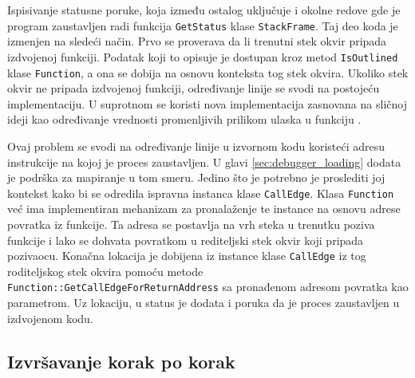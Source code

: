 \documentclass[12pt,oneside]{memoir}
\begin{document}
Ispisivanje statusne poruke, koja između ostalog uključuje i okolne redove gde je program zaustavljen radi funkcija \verb|GetStatus| klase \verb|StackFrame|.
Taj deo koda je izmenjen na sledeći način.
Prvo se proverava da li trenutni stek okvir pripada izdvojenoj funkciji.
Podatak koji to opisuje je dostupan kroz metod \verb|IsOutlined| klase \verb|Function|, a ona se dobija na osnovu konteksta tog stek okvira.
Ukoliko stek okvir ne pripada izdvojenoj funkciji, određivanje linije se svodi na postojeću implementaciju.
U suprotnom se koristi nova implementacija zasnovana na sličnoj ideji kao određivanje vrednosti promenljivih prilikom ulaska u funkciju \cite{sowda2019entryvalues}.

Ovaj problem se svodi na određivanje linije u izvornom kodu koristeći adresu instrukcije na kojoj je proces zaustavljen.
U glavi \ref{sec:debugger_loading} dodata je podrška za mapiranje u tom smeru.
Jedino što je potrebno je proslediti joj kontekst kako bi se odredila ispravna instanca klase \verb|CallEdge|.
Klasa \verb|Function| već ima implementiran mehanizam za pronalaženje te instance na osnovu adrese povratka iz funkcije.
Ta adresa se postavlja na vrh steka u trenutku poziva funkcije i lako se dohvata povratkom u rediteljski stek okvir koji pripada pozivaocu.
Konačna lokacija je dobijena iz instance klase \verb|CallEdge| iz tog roditeljskog stek okvira pomoću metode \verb|Function::GetCallEdgeForReturnAddress| sa pronađenom adresom povratka kao parametrom.  
Uz lokaciju, u status je dodata i poruka da je proces zaustavljen u izdvojenom kodu.

\subsection{Izvršavanje korak po korak}
\end{document}
